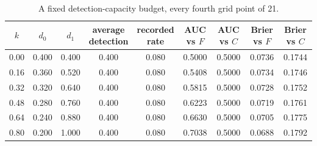 \begin{table}[htbp]
\centering
\caption{A fixed detection-capacity budget, every fourth grid point of 21.}
\label{tab:budget}
\small
\begin{tabular}{ccccccccc}
\toprule
$k$ & $d_0$ & $d_1$ & \shortstack{average\\detection} & \shortstack{recorded\\rate}
& AUC vs $F$ & AUC vs $C$ & Brier vs $F$ & Brier vs $C$ \\
\midrule
0.00 & 0.400 & 0.400 & 0.400 & 0.080 & 0.5000 & 0.5000 & 0.0736 & 0.1744 \\
0.16 & 0.360 & 0.520 & 0.400 & 0.080 & 0.5408 & 0.5000 & 0.0734 & 0.1746 \\
0.32 & 0.320 & 0.640 & 0.400 & 0.080 & 0.5815 & 0.5000 & 0.0728 & 0.1752 \\
0.48 & 0.280 & 0.760 & 0.400 & 0.080 & 0.6223 & 0.5000 & 0.0719 & 0.1761 \\
0.64 & 0.240 & 0.880 & 0.400 & 0.080 & 0.6630 & 0.5000 & 0.0705 & 0.1775 \\
0.80 & 0.200 & 1.000 & 0.400 & 0.080 & 0.7038 & 0.5000 & 0.0688 & 0.1792 \\
\bottomrule
\end{tabular}
\end{table}

